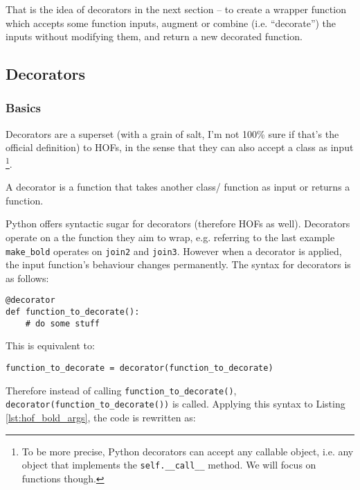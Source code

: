\documentclass[a4paper]{article}
\begin{document}
That is the idea of decorators in the next section -- to create a wrapper function which accepts some function inputs, augment or combine (i.e. ``decorate'') the inputs without modifying them, and return a new decorated function.




\subsection{Decorators}


\subsubsection{Basics}

Decorators are  a superset (with a grain of salt, I'm not 100\% sure if that's the official definition) to HOFs, in the sense that they can also accept a class as input \footnote{To be more precise, Python decorators can accept any callable object, i.e. any object that implements the \texttt{self.\_\_call\_\_} method. We will focus on functions though.}.
\begin{definition}[Decorator]
A decorator is a function that takes another class/ function as input or returns a function.
\end{definition}
Python offers syntactic sugar for decorators (therefore HOFs as well). Decorators operate on a the function they aim to wrap, e.g. referring to the last example \texttt{make\_bold} operates on \texttt{join2} and \texttt{join3}. However when a decorator is applied, the input function's behaviour changes permanently. The syntax for decorators is as follows:
\begin{verbatim}
@decorator
def function_to_decorate():
    # do some stuff
\end{verbatim}
This is equivalent to:
\begin{verbatim}
function_to_decorate = decorator(function_to_decorate)
\end{verbatim}

Therefore instead of calling \texttt{function\_to\_decorate()}, \texttt{decorator(function\_to\_decorate())} is called. Applying this syntax to Listing \ref{lst:hof_bold_args}, the code is rewritten as:


\end{document}
